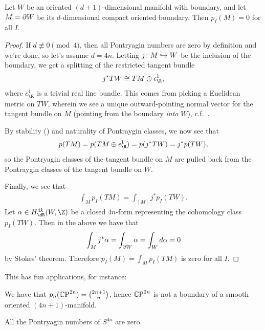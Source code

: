 \documentclass[11pt]{book}
\begin{document}
\begin{lemma}\label{lem:pontryagin-numbers-of-boundary-are-zero} 
Let $W$ be an oriented $(d+1)$-dimensional manifold with boundary, and let $M = \partial W$ be its $d$-dimensional compact oriented boundary. Then $p_I(M) = 0$ for all $I$.
\end{lemma}
\begin{proof} If $d \not\equiv 0\pmod{4}$, then all Pontryagin numbers are zero by definition and we're done, so let's assume $d = 4n$. Letting $j \colon M \xhookrightarrow{} W$ be the inclusion of the boundary, we get a splitting of the restricted tangent bundle
\begin{align*}
    j^\ast TW \cong TM \oplus \epsilon_\R^1,
\end{align*}
where $\epsilon_\R^1$ is a trivial real line bundle. This comes from picking a Euclidean metric on $TW$, wherein we see a unique outward-pointing normal vector for the tangent bundle on $M$ (pointing from the boundary \emph{into} $W$), c.f.~\cite[4.9]{MilnorStasheff}.

By stability () and naturality of Pontraygin classes, we now see that
\begin{align*}
    p(TM) = p(TM \oplus \epsilon_\R^1) = p(j^\ast TW) = j^\ast p(TW),
\end{align*}
so the Pontryagin classes of the tangent bundle on $M$ are pulled back from the Pontraygin classes of the tangent bundle on $W$.

Finally, we see that
\begin{align*}
    \int_M p_I(TM) = \int_{[M]} j^\ast p_I(TW).
\end{align*}
Let $\alpha \in H_{\dR}^{4k}(W,\Z)$ be a closed $4n$-form representing the cohomology class $p_I(TW)$. Then in the above we have that
\begin{align*}
    \int_M j^\ast \alpha = \int_{\partial W} \alpha = \int_W d\alpha = 0
\end{align*}
by Stokes' theorem. Therefore $p_I(M) = \int_M p_I(TM)$ is zero for all $I$.
\end{proof}

This has fun applications, for instance:

\begin{example} We have that $p_n({\mathbb{C}\text{P}}^{2n}) = \binom{2n+1}{n}$, hence ${\mathbb{C}\text{P}}^{2n}$ is not a boundary of a smooth oriented $(4n+1)$-manifold.
\end{example}

\begin{example} All the Pontryagin numbers of $S^{4n}$ are zero.
\end{example}
\end{document}
